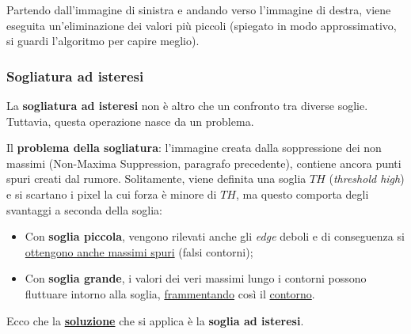 \documentclass[a4paper]{article}
\begin{document}
	\noindent
	Partendo dall'immagine di sinistra e andando verso l'immagine di destra, viene eseguita un'eliminazione dei valori più piccoli (spiegato in modo approssimativo, si guardi l'algoritmo per capire meglio).\newpage
	
	\subsubsection{Sogliatura ad isteresi}
	
	La \textcolor{Red3}{\textbf{sogliatura ad isteresi}} non è altro che un confronto tra diverse soglie. Tuttavia, questa operazione nasce da un problema.\newline
	
	\noindent
	Il \textbf{problema della sogliatura}: l'immagine creata dalla soppressione dei non massimi (Non-Maxima Suppression, paragrafo precedente), contiene ancora punti spuri creati dal rumore.\newline
	Solitamente, viene definita una soglia $TH$ (\emph{threshold high}) e si scartano i pixel la cui forza è minore di $TH$, ma questo comporta degli svantaggi a seconda della soglia:
	\begin{itemize}
		\item Con \textbf{soglia piccola}, vengono rilevati anche gli \emph{edge} deboli e di conseguenza si \underline{ottengono anche massimi spuri} (falsi contorni);
		
		\item Con \textbf{soglia grande}, i valori dei veri massimi lungo i contorni possono fluttuare intorno alla soglia, \underline{frammentando} così il \underline{contorno}.
	\end{itemize}
	Ecco che la \textbf{\underline{soluzione}} che si applica è la \textbf{soglia ad isteresi}.\newline
	
\end{document}
